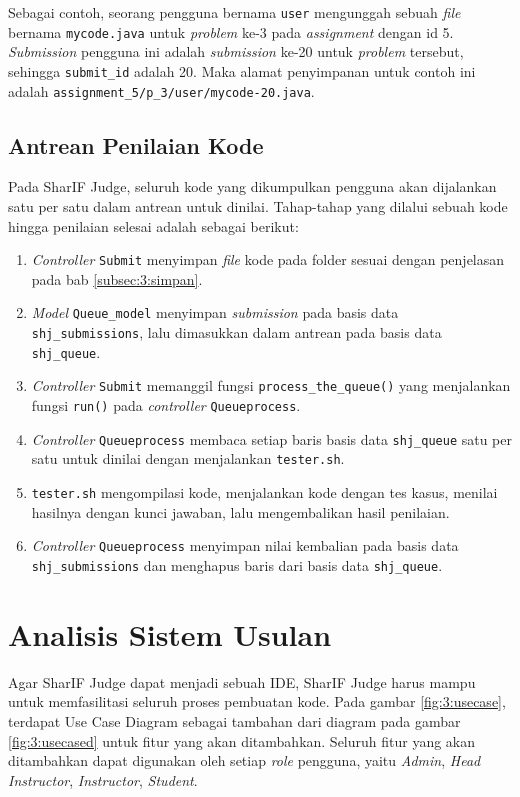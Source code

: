 Sebagai contoh, seorang pengguna bernama \verb|user| mengunggah sebuah \textit{file} bernama \verb|mycode.java| untuk \textit{problem} ke-3 pada \textit{assignment} dengan id 5. \textit{Submission} pengguna ini adalah \textit{submission} ke-20 untuk \textit{problem} tersebut, sehingga \verb|submit_id| adalah 20. Maka alamat penyimpanan untuk contoh ini adalah \verb|assignment_5/p_3/user/mycode-20.java|.


\subsection{Antrean Penilaian Kode}
\label{subsec:3:antrean} 
Pada SharIF Judge, seluruh kode yang dikumpulkan pengguna akan dijalankan satu per satu dalam antrean untuk dinilai. Tahap-tahap yang dilalui sebuah kode hingga penilaian selesai adalah sebagai berikut:

\begin{enumerate}
    \item \textit{Controller} \verb|Submit| menyimpan \textit{file} kode pada folder sesuai dengan penjelasan pada bab \ref{subsec:3:simpan}.
    \item \textit{Model} \verb|Queue_model| menyimpan \textit{submission} pada basis data \verb|shj_submissions|, lalu dimasukkan dalam antrean pada basis data \verb|shj_queue|.
    \item \textit{Controller} \verb|Submit| memanggil fungsi \verb|process_the_queue()| yang menjalankan fungsi \verb|run()| pada \textit{controller} \verb|Queueprocess|.
    \item \textit{Controller} \verb|Queueprocess| membaca setiap baris basis data \verb|shj_queue| satu per satu untuk dinilai dengan menjalankan \verb|tester.sh|.
    \item \verb|tester.sh| mengompilasi kode, menjalankan kode dengan tes kasus, menilai hasilnya dengan kunci jawaban, lalu mengembalikan hasil penilaian.
    \item \textit{Controller} \verb|Queueprocess| menyimpan nilai kembalian pada basis data \verb|shj_submissions| dan menghapus baris dari basis data \verb|shj_queue|.
\end{enumerate}

\section{Analisis Sistem Usulan}
\label{sec:3:analisisusulan} 
Agar SharIF Judge dapat menjadi sebuah IDE, SharIF Judge harus mampu untuk memfasilitasi seluruh proses pembuatan kode. Pada gambar \ref{fig:3:usecase}, terdapat Use Case Diagram sebagai tambahan dari diagram pada gambar \ref{fig:3:usecased} untuk fitur yang akan ditambahkan. Seluruh fitur yang akan ditambahkan dapat digunakan oleh setiap \textit{role} pengguna, yaitu \textit{Admin}, \textit{Head Instructor}, \textit{Instructor}, \textit{Student}.
   
